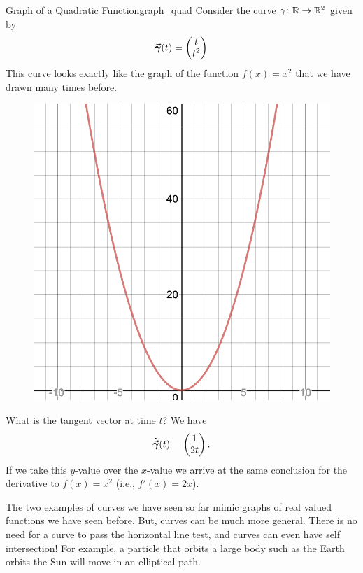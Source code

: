         \begin{ex}{Graph of a Quadratic Function}{graph_quad}
        Consider the curve $\gamma\colon \mathbb{R} \to \mathbb{R}^2$ given by
        \[
        \boldsymbol{\vec{\gamma}}(t)=\begin{pmatrix} t \\ t^2 \end{pmatrix}
        \]
        This curve looks exactly like the graph of the function $f(x)=x^2$ that we have drawn many times before. 
        \begin{figure}[H]
            \centering
            \includegraphics[width=.4\textwidth]{Figures_Part_6/quadratic_curve.png}
        \end{figure}
        What is the tangent vector at time $t$? We have
        \[
        \boldsymbol{\dot{\vec{\gamma}}}(t)=\begin{pmatrix} 1 \\ 2t \end{pmatrix}.
        \]
        If we take this $y$-value over the $x$-value we arrive at the same conclusion for the derivative to $f(x)=x^2$ (i.e., $f'(x)=2x$).
        \end{ex}
        
        The two examples of curves we have seen so far mimic graphs of real valued functions we have seen before.  But, curves can be much more general.  There is no need for a curve to pass the horizontal line test, and curves can even have self intersection! For example, a particle that orbits a large body such as the Earth orbits the Sun will move in an elliptical path.  
        
